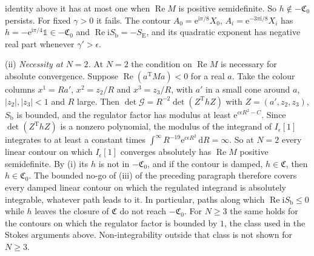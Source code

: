 identity above it has at most one when \(\operatorname{Re}M\) is positive semidefinite. So \(h\notin-\mathfrak C_0\) persists. For fixed \(\gamma>0\) it fails. The contour \(A_0=\mathrm e^{\mathrm i\pi/8}X_0\), \(A_i=\mathrm e^{-3\pi\mathrm i/8}X_i\) has \(h=-\mathrm e^{\mathrm i\pi/4}\mathbb 1\in-\mathfrak C_0\) and \(\operatorname{Re}\mathrm iS_{\mathrm b}=-S_{\mathrm E}\), and its quadratic exponent has negative real part whenever \(\gamma'>\epsilon\).

(ii) \emph{Necessity at \(N=2\).} At \(N=2\) the condition on \(\operatorname{Re}M\) is necessary for absolute convergence. Suppose \(\operatorname{Re}(a^{\mathrm T}Ma)<0\) for a real \(a\). Take the colour columns \(x^1=Ra'\), \(x^2=z_2/R\) and \(x^3=z_3/R\), with \(a'\) in a small cone around \(a\), \(|z_2|,|z_3|<1\) and \(R\) large. Then \(\det\mathcal G=R^{-2}\det(Z^{\mathrm T}hZ)\) with \(Z=(a',z_2,z_3)\), \(S_{\mathrm b}\) is bounded, and the regulator factor has modulus at least \(\mathrm e^{c\epsilon R^2-C}\). Since \(\det(Z^{\mathrm T}hZ)\) is a nonzero polynomial, the modulus of the integrand of \(I_\epsilon[1]\) integrates to at least a constant times \(\int^\infty R^{-19}\mathrm e^{c\epsilon R^2}\,\mathrm dR=\infty\). So at \(N=2\) every linear contour on which \(I_\epsilon[1]\) converges absolutely has \(\operatorname{Re}M\) positive semidefinite. By (i) its \(h\) is not in \(-\mathfrak C_0\), and if the contour is damped, \(h\in\mathfrak C\), then \(h\in\mathfrak C_0\). The bounded no-go of (iii) of the preceding paragraph therefore covers every damped linear contour on which the regulated integrand is absolutely integrable, whatever path leads to it. In particular, paths along which \(\operatorname{Re}\mathrm iS_{\mathrm b}\le0\) while \(h\) leaves the closure of \(\mathfrak C\) do not reach \(-\mathfrak C_0\). For \(N\ge3\) the same holds for the contours on which the regulator factor is bounded by \(1\), the class used in the Stokes arguments above. Non-integrability outside that class is not shown for \(N\ge3\).

